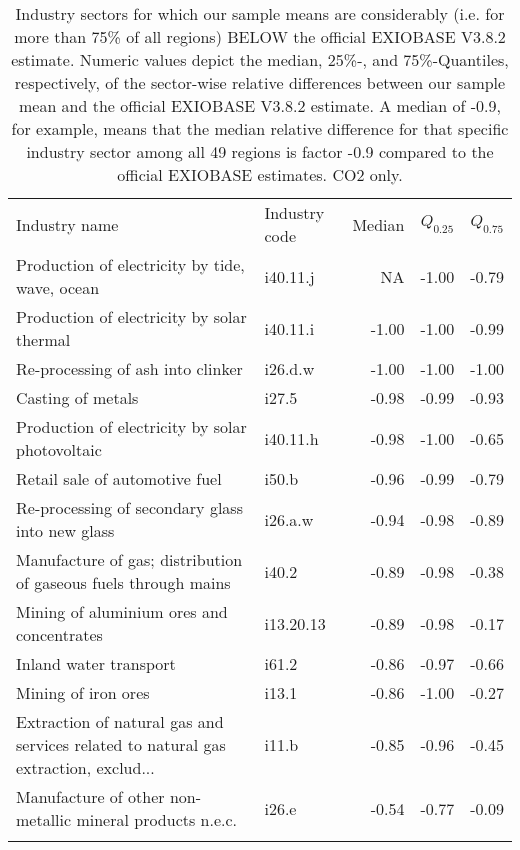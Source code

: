 \begin{table}

\caption{Industry sectors for which our sample means are considerably 
  (i.e. for more than 75\% of all regions) BELOW the official EXIOBASE V3.8.2 
  estimate. Numeric values depict the median, 25\%-, and 75\%-Quantiles, 
  respectively, of the sector-wise relative differences between our sample mean 
  and the official EXIOBASE V3.8.2 estimate. A median of -0.9, for example, means
  that the median relative difference for that specific industry sector among
  all 49 regions is factor -0.9 compared to the official EXIOBASE estimates. 
  CO2 only.}
\centering
\begin{tabular}[t]{llrrr}
\tophline
Industry name & Industry code & Median & $Q_{0.25}$ & $Q_{0.75}$\\
\middlehline
Production of electricity by tide, wave, ocean & i40.11.j & NA & -1.00 & -0.79\\
Production of electricity by solar thermal & i40.11.i & -1.00 & -1.00 & -0.99\\
Re-processing of ash into clinker & i26.d.w & -1.00 & -1.00 & -1.00\\
Casting of metals & i27.5 & -0.98 & -0.99 & -0.93\\
Production of electricity by solar photovoltaic & i40.11.h & -0.98 & -1.00 & -0.65\\
Retail sale of automotive fuel & i50.b & -0.96 & -0.99 & -0.79\\
Re-processing of secondary glass into new glass & i26.a.w & -0.94 & -0.98 & -0.89\\
Manufacture of gas; distribution of gaseous fuels through mains & i40.2 & -0.89 & -0.98 & -0.38\\
Mining of aluminium ores and concentrates & i13.20.13 & -0.89 & -0.98 & -0.17\\
Inland water transport & i61.2 & -0.86 & -0.97 & -0.66\\
Mining of iron ores & i13.1 & -0.86 & -1.00 & -0.27\\
Extraction of natural gas and services related to natural gas extraction, exclud... & i11.b & -0.85 & -0.96 & -0.45\\
Manufacture of other non-metallic mineral products n.e.c. & i26.e & -0.54 & -0.77 & -0.09\\
\bottomhline
\end{tabular}
\end{table}
